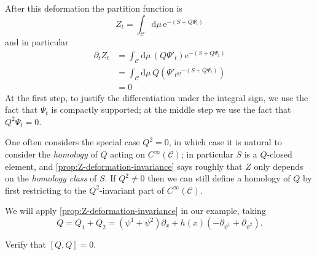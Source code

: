 \documentclass[12pt,letterpaper,reqno]{article}
\numberwithin{equation}{section}
\newcommand{\cC}{\ensuremath{\mathcal C}}
\newcommand{\e}{{\mathrm e}}
\newcommand{\de}{\mathrm{d}}
\newcommand{\ti}[1]{\textit{#1}}
\begin{document}
\begin{pf}
After this deformation the partition function is
\begin{equation}
  Z_t = \int_\cC \de \mu \, \e^{-(S + Q \Psi_t)}
\end{equation}
and in particular
\begin{align}
  \partial_t Z_t &= \int_\cC \de \mu \, (Q \Psi'_t) \e^{-(S + Q \Psi_t)} \\
  &= \int_\cC \de \mu \, Q \left( \Psi'_t \e^{-(S + Q \Psi_t)} \right) \\
  &= 0
\end{align}
At the first step, to justify the differentiation under the 
integral sign, we use the fact that $\Psi_t$ is compactly supported;
at the middle step we use the fact that $Q^2 \Psi_t = 0$.
\end{pf}

One often considers the special case $Q^2 = 0$, in which case it is natural to consider
the \ti{homology} of $Q$ acting on $C^\infty(\cC)$;
in particular $S$ is a $Q$-closed element, and \autoref{prop:Z-deformation-invariance}
says roughly that $Z$ only depends on the \ti{homology class} of $S$.
If $Q^2 \neq 0$ then we can still define a homology of $Q$ by first restricting to the 
$Q^2$-invariant part of $C^\infty(\cC)$.

We will apply \autoref{prop:Z-deformation-invariance} in our example, taking
\begin{equation}
  Q = Q_1 + Q_2 = (\psi^1 + \psi^2) \partial_x + h(x) (-\partial_{\psi^1} + \partial_{\psi^2}).
\end{equation}

\begin{exercise}
Verify that $[Q,Q] = 0$.
\end{exercise}
\end{document}
